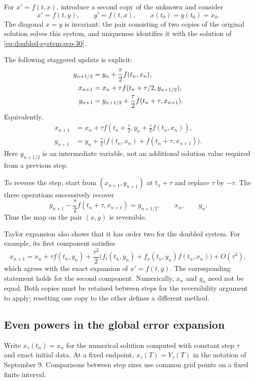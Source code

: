 For \(x'=f(t,x)\), introduce a second copy of the unknown and consider
\begin{equation}\label{eq:doubled-system-sep-30}
 x'=f(t,y),\qquad y'=f(t,x),\qquad x(t_0)=y(t_0)=x_0.
\end{equation}
The diagonal \(x=y\) is invariant: the pair consisting of two copies
of the original solution solves this system, and uniqueness identifies
it with the solution of \eqref{eq:doubled-system-sep-30}.

The following staggered update is explicit:
\begin{align}
 y_{n+1/2}&=y_n+\frac\tau2 f(t_n,x_n),\notag\\
 x_{n+1}&=x_n+\tau f(t_n+\tau/2,y_{n+1/2}),
       \label{eq:doubled-step-sep-30}\\
 y_{n+1}&=y_{n+1/2}+\frac\tau2 f(t_n+\tau,x_{n+1}).\notag
\end{align}
Equivalently,
\begin{align*}
 x_{n+1}&=x_n+\tau f\left(t_n+\frac\tau2,
                         y_n+\frac\tau2 f(t_n,x_n)\right),\\
 y_{n+1}&=y_n+\frac\tau2
           \bigl(f(t_n,x_n)+f(t_n+\tau,x_{n+1})\bigr).
\end{align*}
Here \(y_{n+1/2}\) is an intermediate variable, not an additional
solution value required from a previous step.

To reverse the step, start from \((x_{n+1},y_{n+1})\) at
\(t_n+\tau\) and replace \(\tau\) by \(-\tau\). The three
operations successively recover
\[
 y_{n+1}-\frac\tau2 f(t_n+\tau,x_{n+1})=y_{n+1/2},
 \qquad x_n,\qquad y_n.
\]
Thus the map on the pair \((x,y)\) is reversible.

Taylor expansion also shows that it has order two for the doubled
system. For example, its first component satisfies
\[
 x_{n+1}=x_n+\tau f(t_n,y_n)
 +\frac{\tau^2}{2}
 \bigl(f_t(t_n,y_n)+f_x(t_n,y_n)f(t_n,x_n)\bigr)
 +O(\tau^3),
\]
which agrees with the exact expansion of \(x'=f(t,y)\).
The corresponding statement holds for the second component.
Numerically, \(x_n\) and \(y_n\) need not be equal. Both copies must
be retained between steps for the reversibility argument to apply;
resetting one copy to the other defines a different method.

\subsection{Even powers in the global error expansion}

Write \(x_\tau(t_n)=x_n\) for the numerical solution computed with
constant step \(\tau\) and exact initial data. At a fixed endpoint,
\(x_\tau(T)=Y_\tau(T)\) in the notation of September 9.
Comparisons between step sizes use common grid points on a fixed
finite interval.

